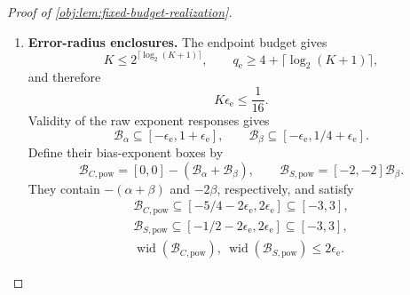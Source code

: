 \documentclass[11pt]{article}
\begin{document}
\begin{proof}[Proof of \cref{obj:lem:fixed-budget-realization}]
\begin{enumerate}
The binary marks used in \cref{obj:def:coordinate-estimates} are exact rational numbers in \([0,1]\). Multiplication by their products preserves the displayed kernel-width bound. There are exactly
\[
\#\{(i,i'):1\le i,i'\le n,\ i\ne i'\}=n(n-1)
\]
ordered pairs. Hence the positive rational normalization in \cref{obj:def:projection-statistic} cancels this factor in the sum of widths:
\[
\operatorname{wid}\bigl(\mathcal B[\mathbb U_{n,k}(W,V)]\bigr)
\le
\frac{n(n-1)\,160k^2\epsilon_{\mathrm e}}{n(n-1)}
=160k^2\epsilon_{\mathrm e}
\]
for the marks used here. The empirical mean in \(\widehat C_n\) is exact. Soundness of the operations therefore supplies successful coordinate boxes with
\[
\begin{gathered}
\widehat C_n\in\mathcal B[\widehat C_n],
\qquad
\widehat S_n\in\mathcal B[\widehat S_n],\\
\operatorname{wid}\bigl(\mathcal B[\widehat C_n]\bigr)
\le160k_C^2\epsilon_{\mathrm e},
\qquad
\operatorname{wid}\bigl(\mathcal B[\widehat S_n]\bigr)
\le160k_S^2\epsilon_{\mathrm e}.
\end{gathered}
\]

\item \textbf{Error-radius enclosures.}
The endpoint budget gives
\[
K\le2^{\lceil\log_2(K+1)\rceil},
\qquad
q_{\mathrm e}\ge4+\lceil\log_2(K+1)\rceil,
\]
and therefore
\[
K\epsilon_{\mathrm e}\le\frac1{16}.
\]
Validity of the raw exponent responses gives
\[
\mathcal B_\alpha\subseteq[-\epsilon_{\mathrm e},1+\epsilon_{\mathrm e}],
\qquad
\mathcal B_\beta\subseteq[-\epsilon_{\mathrm e},1/4+\epsilon_{\mathrm e}].
\]
Define their bias-exponent boxes by
\[
\mathcal B_{C,\mathrm{pow}}=[0,0]-(\mathcal B_\alpha+\mathcal B_\beta),
\qquad
\mathcal B_{S,\mathrm{pow}}=[-2,-2]\mathcal B_\beta.
\]
They contain \(-(\alpha+\beta)\) and \(-2\beta\), respectively, and satisfy
\[
\begin{gathered}
\mathcal B_{C,\mathrm{pow}}
\subseteq[-5/4-2\epsilon_{\mathrm e},2\epsilon_{\mathrm e}]
\subseteq[-3,3],\\
\mathcal B_{S,\mathrm{pow}}
\subseteq[-1/2-2\epsilon_{\mathrm e},2\epsilon_{\mathrm e}]
\subseteq[-3,3],\\
\operatorname{wid}(\mathcal B_{C,\mathrm{pow}}),
\ \operatorname{wid}(\mathcal B_{S,\mathrm{pow}})
\le2\epsilon_{\mathrm e}.
\end{gathered}
\]


\end{enumerate}
\end{proof}
\end{document}
